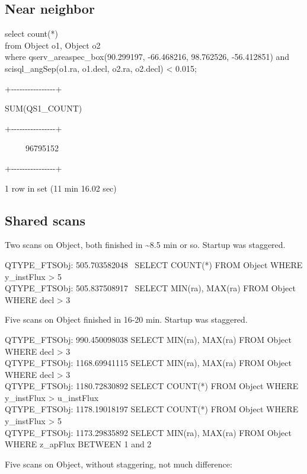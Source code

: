 \documentclass[DM,toc]{lsstdoc}
\begin{document}
\subsection{Near neighbor}\label{near-neighbor}

select count(*)\\
from Object o1, Object o2\\
where qserv\_areaspec\_box(90.299197, -66.468216, 98.762526, -56.412851)
and scisql\_angSep(o1.ra, o1.decl, o2.ra, o2.decl) \textless{} 0.015;

+-\/-\/-\/-\/-\/-\/-\/-\/-\/-\/-\/-\/-\/-\/-\/-+

\textbar{} SUM(QS1\_COUNT) \textbar{}

+-\/-\/-\/-\/-\/-\/-\/-\/-\/-\/-\/-\/-\/-\/-\/-+

\textbar{} ~ ~ ~ 96795152 \textbar{}

+-\/-\/-\/-\/-\/-\/-\/-\/-\/-\/-\/-\/-\/-\/-\/-+

1 row in set (11 min 16.02 sec)

\subsection{Shared scans}\label{shared-scans}

Two scans on Object, both finished in \textasciitilde{}8.5 min or so.
Startup was staggered.

QTYPE\_FTSObj: 505.703582048 ~SELECT COUNT(*) FROM Object WHERE
y\_instFlux \textgreater{} 5\\
QTYPE\_FTSObj: 505.837508917 ~SELECT MIN(ra), MAX(ra) FROM Object WHERE
decl \textgreater{} 3

Five scans on Object finished in 16-20 min. Startup was staggered.

QTYPE\_FTSObj: 990.450098038 SELECT MIN(ra), MAX(ra) FROM Object WHERE
decl \textgreater{} 3\\
QTYPE\_FTSObj: 1168.69941115 SELECT MIN(ra), MAX(ra) FROM Object WHERE
decl \textgreater{} 3\\
QTYPE\_FTSObj: 1180.72830892 SELECT COUNT(*) FROM Object WHERE
y\_instFlux \textgreater{} u\_instFlux\\
QTYPE\_FTSObj: 1178.19018197 SELECT COUNT(*) FROM Object WHERE
y\_instFlux \textgreater{} 5\\
QTYPE\_FTSObj: 1173.29835892 SELECT MIN(ra), MAX(ra) FROM Object WHERE
z\_apFlux BETWEEN 1 and 2

Five scans on Object, without staggering, not much difference:
\end{document}

